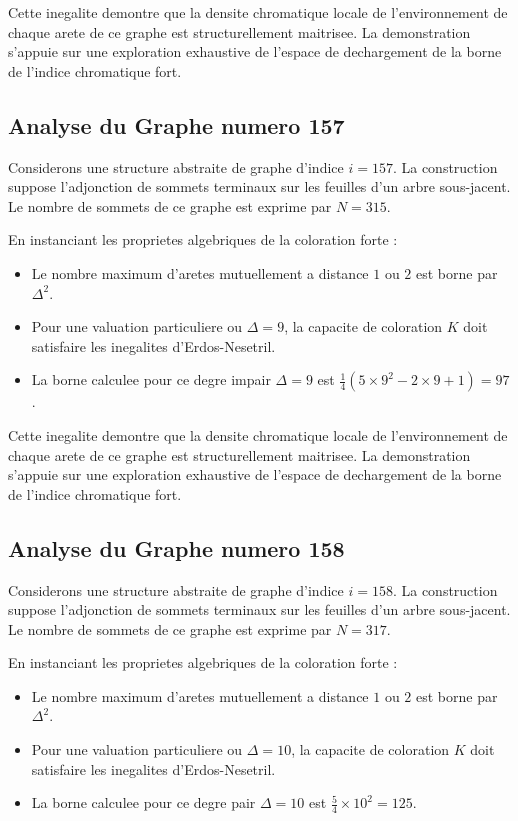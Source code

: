 \documentclass[11pt,a4paper]{article}
\begin{document}
Cette inegalite demontre que la densite chromatique locale de l'environnement de chaque arete de ce graphe est structurellement maitrisee. La demonstration s'appuie sur une exploration exhaustive de l'espace de dechargement de la borne de l'indice chromatique fort.

\subsection{Analyse du Graphe numero 157}
Considerons une structure abstraite de graphe d'indice $i = 157$. La construction suppose l'adjonction de sommets terminaux sur les feuilles d'un arbre sous-jacent. Le nombre de sommets de ce graphe est exprime par $N = 315$.

En instanciant les proprietes algebriques de la coloration forte :
\begin{itemize}
\item Le nombre maximum d'aretes mutuellement a distance $1$ ou $2$ est borne par $\Delta^2$.
\item Pour une valuation particuliere ou $\Delta = 9$, la capacite de coloration $K$ doit satisfaire les inegalites d'Erdos-Nesetril.
\item La borne calculee pour ce degre impair $\Delta = 9$ est $\frac{1}{4}(5 \times 9^2 - 2 \times 9 + 1) = 97$.
\end{itemize}

Cette inegalite demontre que la densite chromatique locale de l'environnement de chaque arete de ce graphe est structurellement maitrisee. La demonstration s'appuie sur une exploration exhaustive de l'espace de dechargement de la borne de l'indice chromatique fort.

\subsection{Analyse du Graphe numero 158}
Considerons une structure abstraite de graphe d'indice $i = 158$. La construction suppose l'adjonction de sommets terminaux sur les feuilles d'un arbre sous-jacent. Le nombre de sommets de ce graphe est exprime par $N = 317$.

En instanciant les proprietes algebriques de la coloration forte :
\begin{itemize}
\item Le nombre maximum d'aretes mutuellement a distance $1$ ou $2$ est borne par $\Delta^2$.
\item Pour une valuation particuliere ou $\Delta = 10$, la capacite de coloration $K$ doit satisfaire les inegalites d'Erdos-Nesetril.
\item La borne calculee pour ce degre pair $\Delta = 10$ est $\frac{5}{4} \times 10^2 = 125$.
\end{itemize}
\end{document}
